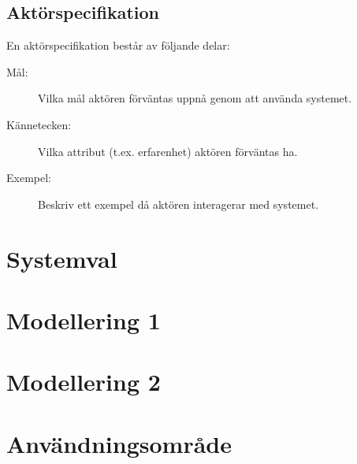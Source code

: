 \documentclass[a4paper,12pt]{article}
\begin{document}
\subsection{\textsf{Aktörspecifikation}}
En aktörspecifikation består av följande delar:

\begin{description}
\item[Mål:] Vilka mål aktören förväntas uppnå genom att använda systemet.
\item[Kännetecken:] Vilka attribut (t.ex. erfarenhet) aktören förväntas ha.
\item[Exempel:] Beskriv ett exempel då aktören interagerar med systemet.
\end{description}

\newpage
\section{\textsf{Systemval}}

\newpage
\section{\textsf{Modellering 1}}

\newpage
\section{\textsf{Modellering 2}}

\newpage
\section{\textsf{Användningsområde}}
\end{document}
